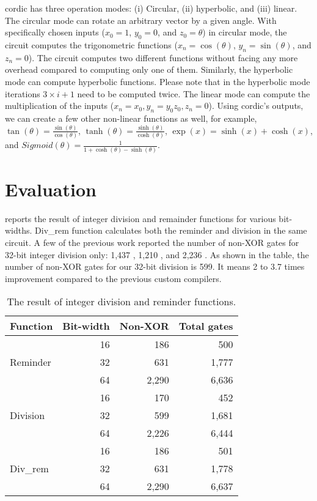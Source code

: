 \acrshort{cordic} has three operation modes:
(i) Circular, (ii) hyperbolic, and (iii) linear.
The circular mode can rotate an arbitrary vector by a given angle.
With specifically chosen inputs ($x_0=1$, $y_0=0$, and $z_0=\theta$) in circular mode, the circuit computes the trigonometric functions ($x_n=\cos(\theta)$, $y_n=\sin(\theta)$, and $z_n=0$).
The circuit computes two different functions without facing any more overhead compared to computing only one of them.
Similarly, the hyperbolic mode can compute hyperbolic functions.
Please note that in the hyperbolic mode iterations $3\times i+1$ need to be computed twice.
The linear mode can compute the multiplication of the inputs ($x_n=x_0, y_n=y_0z_0, z_n=0$).
Using \acrshort{cordic}'s outputs, we can create a few other non-linear functions as well, for example,
$\tan(\theta)=\frac{\sin(\theta)}{\cos(\theta)}$,
$\tanh(\theta)=\frac{\sinh(\theta)}{\cosh(\theta)}$,
$\exp(x)=\sinh (x) + \cosh (x)$, and
$Sigmoid(\theta)=\frac{1}{1+\cosh(\theta)-\sinh(\theta)}$.

\section{Evaluation}
 reports the result of integer division and remainder functions for various bit-widths.
Div\_rem function calculates both the reminder and division in the same circuit.
A few of the previous work reported the number of non-XOR gates for 32-bit integer division only: 1,437 \cite{mood2016frigate}, 1,210 \cite{zahur2015obliv}, and 2,236 \cite{liu2015oblivm}.
As shown in the table, the number of non-XOR gates for our 32-bit division is 599.
It means 2 to 3.7 times improvement compared to the previous custom compilers.

\begin{table}
\center
\caption{The result of integer division and reminder functions.}\label{table:div}
\begin{tabular}{l||r||r|r}
	Function                  & \multicolumn{1}{c|}{Bit-width} & \multicolumn{1}{c|}{Non-XOR} & \multicolumn{1}{c}{Total gates} \\ \hline \hline
\multirow{3}{*}{Reminder} & 16        & 186     & 500         \\
                          & 32        & 631     & 1,777       \\
                          & 64        & 2,290   & 6,636       \\ \hline \hline
\multirow{3}{*}{Division} & 16        & 170     & 452         \\
                          & 32        & 599     & 1,681       \\
                          & 64        & 2,226   & 6,444       \\ \hline \hline
\multirow{3}{*}{Div\_rem} & 16        & 186     & 501         \\
                          & 32        & 631     & 1,778       \\
                          & 64        & 2,290   & 6,637
\end{tabular}
\end{table}

